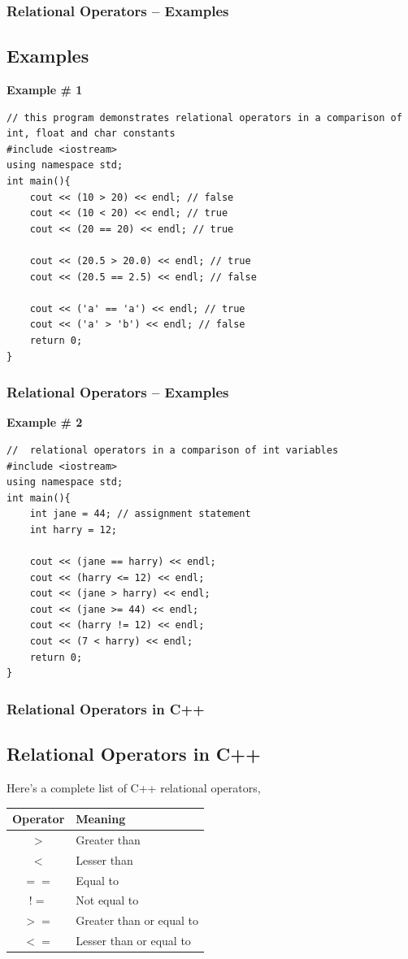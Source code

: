 \documentclass{beamer}
\begin{document}
\begin{frame}[fragile]
    \frametitle{Relational Operators -- Examples}
    \subsection{Examples} %
    \label{sub:examples}
    \textbf{Example \# 1}
    \lstset{style=mystyle}
    \begin{lstlisting}
// this program demonstrates relational operators in a comparison of int, float and char constants
#include <iostream>
using namespace std;
int main(){
    cout << (10 > 20) << endl; // false
    cout << (10 < 20) << endl; // true
    cout << (20 == 20) << endl; // true

    cout << (20.5 > 20.0) << endl; // true
    cout << (20.5 == 2.5) << endl; // false

    cout << ('a' == 'a') << endl; // true
    cout << ('a' > 'b') << endl; // false
    return 0;
}\end{lstlisting}
\end{frame}

\begin{frame}[fragile]
    \frametitle{Relational Operators -- Examples}
    \textbf{Example \# 2}
    \lstset{style=mystyle}
    \begin{lstlisting}
//  relational operators in a comparison of int variables
#include <iostream>
using namespace std;
int main(){
    int jane = 44; // assignment statement
    int harry = 12;

    cout << (jane == harry) << endl;
    cout << (harry <= 12) << endl;
    cout << (jane > harry) << endl;
    cout << (jane >= 44) << endl;
    cout << (harry != 12) << endl;
    cout << (7 < harry) << endl;
    return 0;
}\end{lstlisting}
\end{frame}

\begin{frame}
    \frametitle{Relational Operators in C++}
    \subsection{Relational Operators in C++} %
    \label{sub:a_complete_list}
    Here's a complete list of C++ relational operators,
    \begin{table}
        \begin{tabular}{c | l}
        Operator & Meaning \\
        \hline \hline
        $>$ & Greater than \\
        $<$ & Lesser than\\
        $==$ & Equal to\\
        $!=$ & Not equal to\\
        $>=$ & Greater than or equal to\\
        $<=$ & Lesser than or equal to
        \end{tabular}
    \end{table}
\end{frame}
\end{document}
